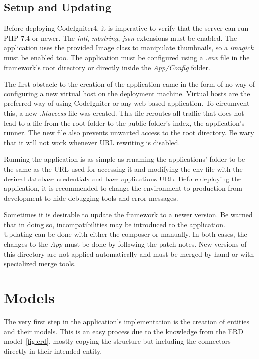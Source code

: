 \documentclass[
  digital,     %
  oneside,     %
  nosansbold,  %
  colorbold, %
  lof,         %
  lot,         %
]{fithesis4}
\begin{document}
\subsection{Setup and Updating}


Before deploying CodeIgniter4, it is imperative to verify that the server can run PHP 7.4 or newer. The \textit{intl}, \textit{mbstring}, \textit{json} extensions must be enabled. The application uses the provided Image class to manipulate thumbnails, so a \textit{imagick} must be enabled too. The application must be configured using a \textit{.env} file in the framework's root directory or directly inside the \textit{App/Config} folder.

The first obstacle to the creation of the application came in the form of no way of configuring a new virtual host on the deployment machine. Virtual hosts are the preferred way of using CodeIgniter or any web-based application. To circumvent this, a new \textit{.htaccess} file was created. This file reroutes all traffic that does not lead to a file from the root folder to the public folder's index, the application's runner. The new file also prevents unwanted access to the root directory. Be wary that it will not work whenever URL rewriting is disabled.

Running the application is as simple as renaming the applications' folder to be the same as the URL used for accessing it and modifying the env file with the desired database credentials and base applications URL. Before deploying the application, it is recommended to change the environment to production from development to hide debugging tools and error messages.

Sometimes it is desirable to update the framework to a newer version. Be warned that in doing so, incompatibilities may be introduced to the application. Updating can be done with either the composer or manually. In both cases, the changes to the \textit{App} must be done by following the patch notes. New versions of this directory are not applied automatically and must be merged by hand or with specialized merge tools.

\section{Models}

The very first step in the application's implementation is the creation of entities and their models. This is an easy process due to the knowledge from the ERD model~\ref{fig:erd}, mostly copying the structure but including the connectors directly in their intended entity.
\end{document}
